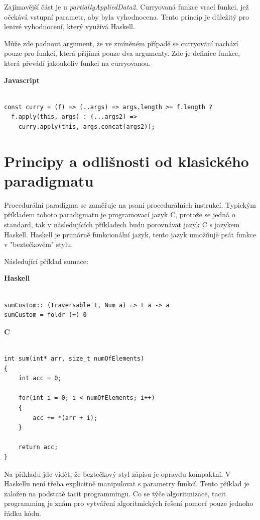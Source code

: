 \documentclass[male,czech]{kithesis}
\begin{document}
Zajímavější část je u \textit{partiallyAppliedData2}. 
Curryovaná funkce vrací funkci, 
jež očekává vstupní parametr, 
aby byla vyhodnocena. 
Tento princip je důležitý
pro lenivé vyhodnocení, 
který využívá Haskell.

Může zde padnout argument, 
že ve zmíněném případě se curryování nachází pouze pro funkci,
která přijímá pouze dva argumenty. 
Zde je definice funkce, 
která převádí jakoukoliv funkci na curryovanou.

\textbf{Javascript}
\begin{verbatim}

const curry = (f) => (..args) => args.length >= f.length ? 
  f.apply(this, args) : (...args2) => 
    curry.apply(this, args.concat(args2));

\end{verbatim}
\section{Principy a odlišnosti od klasického paradigmatu}

Procedurální paradigma se zaměřuje na psaní procedurálních instrukcí.
Typickým příkladem tohoto paradigmatu je programovací jazyk C, 
protože se jedná o standard, 
tak v následujících příkladech budu porovnávat jazyk C s jazykem Haskell.
Haskell je primárně funkcionální jazyk, 
tento jazyk umožňujě psát funkce v "beztečkovém" stylu. 

Následující příklad sumace:

\textbf{Haskell}
\begin{verbatim}

sumCustom:: (Traversable t, Num a) => t a -> a
sumCustom = foldr (+) 0

\end{verbatim}

\textbf{C}
\begin{verbatim}

int sum(int* arr, size_t numOfElements)
{
    int acc = 0;
    
    for(int i = 0; i < numOfElements; i++)
    {
        acc += *(arr + i);
    }
    
    return acc;
}

\end{verbatim}
Na příkladu jde vidět, 
že beztečkový styl zápisu je opravdu kompaktní. 
V Haskellu není třeba explicitně manipulovat s parametry funkcí.
Tento příklad je založen na podstatě tacit programmingu.
Co se týče algoritmizace, 
tacit programming je znám pro vytváření algoritmických řešení pomocí pouze jednoho řádku kódu. 
\end{document}
